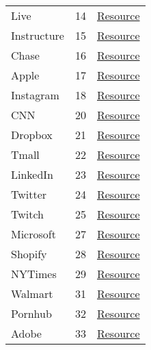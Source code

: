 \begin{longtable}{lrl}
Live          &    14 & \href{http://logincdn.msauth.net/16.000.28394.11/images/ellipsis\_grey.svg}{Resource} \\
Instructure   &    15 & \href{http://www.instructure.com/sites/blog.instructure/files/uploaded-assets/menu/logo/starter.svg}{Resource} \\
Chase         &    16 & \href{http://creditcards.chase.com/R111-003/1110010/images/chasebank-logo-icon.svg}{Resource} \\
Apple         &    17 & \href{http://www.apple.com/ac/globalnav/5/en\_US/images/globalnav/links/tv/image\_large.svg}{Resource} \\
Instagram     &    18 & \href{http://www.instagram.com/static/images/shared/nav-shadow.png/fae1c515f490.png}{Resource} \\
CNN           &    20 & \href{http://cdn.cnn.com/cnn/images/bulletin/arrow.png}{Resource} \\
Dropbox       &    21 & \href{http://cfl.dropboxstatic.com/static/images/icons/icon\_spacer-vflN3BYt2.gif}{Resource} \\
Tmall         &    22 & \href{http://g.alicdn.com/s.gif}{Resource} \\
LinkedIn      &    23 & \href{http://static-exp1.licdn.com/sc/h/3z4gbn751g6l5onl9gg9s5ckg}{Resource} \\
Twitter       &    24 & \href{http://abs.twimg.com/favicons/favicon.ico}{Resource} \\
Twitch        &    25 & \href{http://static.twitchcdn.net/assets/favicon-32-d6025c14e900565d6177.png}{Resource} \\
Microsoft     &    27 & \href{http://www.microsoft.com/onerfstatics/marketingsites-eus-prod/\_h/9be151e5/coreui.statics/images/1x1clear.gif}{Resource} \\
Shopify       &    28 & \href{http://cdn.shopify.com/shopify-marketing\_assets/static/shopify-favicon.png}{Resource} \\
NYTimes       &    29 & \href{http://www.nytimes.com/vi-assets/static-assets/icon-facebook-20x20-fullcolor-7312c440fd2b6f323c675d8a08c023e2.svg}{Resource} \\
Walmart       &    31 & \href{http://www.walmart.com/favicon.ico}{Resource} \\
Pornhub       &    32 & \href{http://ci.phncdn.com/www-static/images/rightArrow.png}{Resource} \\
Adobe         &    33 & \href{http://www.adobe.com/content/dam/cc/icons/device-web.svg}{Resource} \\

\end{longtable}
